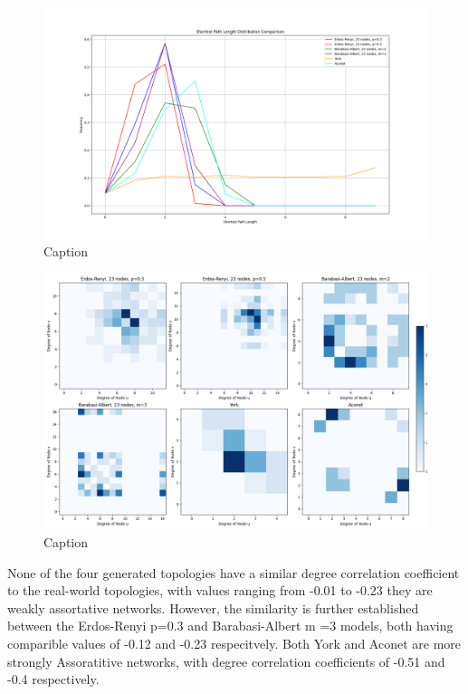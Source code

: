 \begin{figure}
    \centering
    \includegraphics[width=0.9\linewidth]{images/FINAL-TOPO-COMP/line-23.png}
    \caption{Caption}
    \label{fig:enter-label}
\end{figure}

\begin{figure}
    \centering
    \includegraphics[width=0.9\linewidth]{images/FINAL-TOPO-COMP/Degree-correlation-matrices/23-matrix.png}
    \caption{Caption}
    \label{fig:enter-label}
\end{figure}
None of the four generated topologies have a similar degree correlation coefficient to the real-world topologies, with values ranging from -0.01 to -0.23 they are weakly assortative networks. However, the similarity is further established between the Erdos-Renyi p=0.3 and Barabasi-Albert m =3 models, both having comparible values of -0.12 and -0.23 respecitvely. Both York and Aconet are more strongly Assoratitive networks, with degree correlation coefficients of -0.51 and -0.4 respectively. 

